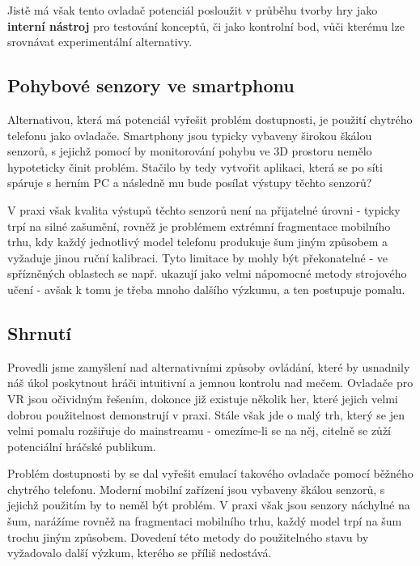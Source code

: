 Jistě má však tento ovladač potenciál posloužit v průběhu tvorby hry jako \textbf{interní nástroj} pro testování konceptů, či jako kontrolní bod, vůči kterému lze srovnávat experimentální alternativy.

\subsection{Pohybové senzory ve smartphonu}

Alternativou, která má potenciál vyřešit problém dostupnosti, je použití chytrého telefonu jako ovladače. Smartphony jsou typicky vybaveny širokou škálou senzorů, s jejichž pomocí by monitorování pohybu ve 3D prostoru nemělo hypoteticky činit problém. Stačilo by tedy vytvořit aplikaci, která se po síti spáruje s herním PC a následně mu bude posílat výstupy těchto senzorů?

V praxi však kvalita výstupů těchto senzorů není na přijatelné úrovni \cite{SmartphoneSensorsEvaluation} - typicky trpí na silné zašumění, rovněž je problémem extrémní fragmentace mobilního trhu, kdy každý jednotlivý model telefonu produkuje šum jiným způsobem a vyžaduje jinou ruční kalibraci. Tyto limitace by mohly být překonatelné - ve spřízněných oblastech se např. ukazují jako velmi nápomocné metody strojového učení \cite{AccelerometerStepDetectionUsingML} - avšak k tomu je třeba mnoho dalšího výzkumu, a ten postupuje pomalu.

\subsection{Shrnutí}
Provedli jsme zamyšlení nad alternativními způsoby ovládání, které by usnadnily náš úkol poskytnout hráči intuitivní a jemnou kontrolu nad mečem. Ovladače pro \acs{VR} jsou očividným řešením, dokonce již existuje několik her, které jejich velmi dobrou použitelnost demonstrují v praxi. Stále však jde o malý trh, který se jen velmi pomalu rozšiřuje do mainstreamu - omezíme-li se na něj, citelně se zůží potenciální hráčské publikum.

Problém dostupnosti by se dal vyřešit emulací takového ovladače pomocí běžného chytrého telefonu. Moderní mobilní zařízení jsou vybaveny škálou senzorů, s jejichž použitím by to neměl být problém. V praxi však jsou senzory náchylné na šum, narážíme rovněž na fragmentaci mobilního trhu, každý model trpí na šum trochu jiným způsobem. Dovedení této metody do použitelného stavu by vyžadovalo další výzkum, kterého se příliš nedostává.


